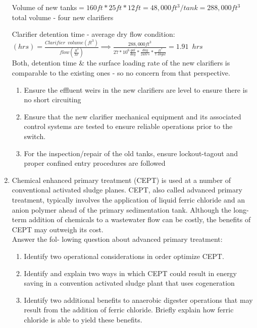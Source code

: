 \begin{enumerate}
Volume of new tanks$=160ft*25ft*12ft=48,000 ft^3/tank=288,000 ft^3$ total volume \enspace - four new clarifiers 

\vspace{0.2cm}
Clarifier detention time  - average dry flow condition:\\
\vspace{0.2cm}
$(hrs) =\frac{Clarifier \enspace volume (ft^3)}{flow (\frac{ft^3}{hr})}\implies \frac{288,000ft^3}{27*10^6\frac{gal}{day}*\frac{day}{24hrs}*\frac{ft^3}{7.48gal}}=1.91 \enspace hrs$\\
\vspace{0.3cm}
Both, detention time \& the surface loading rate of the new clarifiers is comparable to the existing ones - so no concern from that perspective.\\
\begin{enumerate}[label=\roman*]
\item Ensure the effluent weirs in the new clarifiers are level to ensure there is no short circuiting
\item Ensure that the new clarifier mechanical equipment and its associated control systems are tested to ensure reliable operations prior to the switch.
\item For the inspection/repair of the old tanks, ensure lockout-tagout and proper confined entry procedures are followed
\end{enumerate}








\newpage

\item Chemical enhanced primary treatment (CEPT) is used at a number of conventional activated sludge planes. CEPT, also called advanced primary treatment, typically involves the application of liquid ferric chloride and an anion polymer ahead of the primary sedimentation tank. Although the long-term addition of chemicals to a wastewater flow can be costly, the benefits of CEPT may outweigh its cost.\\

Answer the fol- lowing question about advanced primary treatment:
\begin{enumerate}
\item Identify two operational considerations in order optimize CEPT.
\item Identify and explain two ways in which CEPT could result in energy saving in a convention activated sludge plant that uses cogeneration
\item Identify two additional benefits to anaerobic digester operations that may result from the addition of ferric chloride. Briefly explain how ferric chloride is able to yield these benefits.
\end{enumerate}


\end{enumerate}
